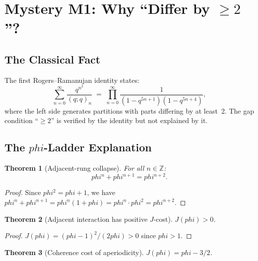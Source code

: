 \documentclass[11pt]{article}
\def\leanverified{}
\def\phig{phi}
\def\Jcost{J}
\theoremstyle{plain}
\newtheorem{theorem}{Theorem}[section]
\theoremstyle{definition}
\theoremstyle{remark}
\newcommand{\leanverified}{\textsuperscript{\textnormal{[\textsc{Lean}]}}}
\newcommand{\Z}{\mathbb{Z}}
\newcommand{\phig}{\varphi}
\newcommand{\Jcost}{J}
\begin{document}
\section[Mystery M1: Why ``Differ by >= 2''?]{Mystery M1: Why ``Differ by $\ge 2$''?}
\label{sec:gap2}

\subsection{The Classical Fact}

The first Rogers--Ramanujan identity states:
\begin{equation}\label{eq:rr1}
  \sum_{n=0}^{\infty} \frac{q^{n^2}}{(q;q)_n}
  \;=\; \prod_{n=0}^{\infty}
       \frac{1}{(1-q^{5n+1})(1-q^{5n+4})},
\end{equation}
where the left side generates partitions with parts differing by at least~2.
The gap condition ``$\ge 2$'' is verified by the identity but not explained by it.

\subsection[The phi-Ladder Explanation]{The $\phig$-Ladder Explanation}

\begin{theorem}[Adjacent-rung collapse]\leanverified\label{thm:collapse}
For all $n \in \Z$:
\begin{equation}\label{eq:collapse}
  \phig^n + \phig^{n+1} = \phig^{n+2}.
\end{equation}
\end{theorem}

\begin{proof}
Since $\phig^2 = \phig + 1$, we have
$\phig^n + \phig^{n+1} = \phig^n(1 + \phig) = \phig^n \cdot \phig^2 = \phig^{n+2}$.
\end{proof}

\begin{theorem}[Adjacent interaction has positive $\Jcost$-cost]\leanverified\label{thm:jcost-positive}
$\Jcost(\phig) > 0$.
\end{theorem}

\begin{proof}
$\Jcost(\phig) = (\phig - 1)^2/(2\phig) > 0$ since $\phig > 1$.
\end{proof}

\begin{theorem}[Coherence cost of aperiodicity]\leanverified\label{thm:coherence-cost}
$\Jcost(\phig) = \phig - 3/2$.
\end{theorem}
\end{document}
